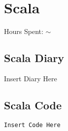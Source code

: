 \documentclass{report}
\begin{document}
\section*{Scala}
Hours Spent: $\sim$
\subsection{Scala Diary}
Insert Diary Here

\subsection*{Scala Code}
\begin{lstlisting}
Insert Code Here
\end{lstlisting}
\end{document}
